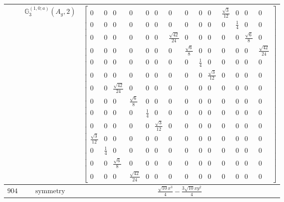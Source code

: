 \documentclass[fleqn,8pt,landscape]{jsarticle}
\begin{document}
\begin{longtable}{ccc}
$  $ & $ \mathbb{G}_{3}^{(1,0;a)}(A_{g},2) $ & $ \begin{bmatrix} 0 & 0 & 0 & 0 & 0 & 0 & 0 & 0 & 0 & 0 & \frac{\sqrt{3}}{12} & 0 & 0 & 0 \\ 0 & 0 & 0 & 0 & 0 & 0 & 0 & 0 & 0 & 0 & 0 & \frac{1}{4} & 0 & 0 \\ 0 & 0 & 0 & 0 & 0 & 0 & \frac{\sqrt{42}}{24} & 0 & 0 & 0 & 0 & 0 & \frac{\sqrt{6}}{8} & 0 \\ 0 & 0 & 0 & 0 & 0 & 0 & 0 & \frac{\sqrt{6}}{8} & 0 & 0 & 0 & 0 & 0 & \frac{\sqrt{42}}{24} \\ 0 & 0 & 0 & 0 & 0 & 0 & 0 & 0 & \frac{1}{4} & 0 & 0 & 0 & 0 & 0 \\ 0 & 0 & 0 & 0 & 0 & 0 & 0 & 0 & 0 & \frac{\sqrt{3}}{12} & 0 & 0 & 0 & 0 \\ 0 & 0 & \frac{\sqrt{42}}{24} & 0 & 0 & 0 & 0 & 0 & 0 & 0 & 0 & 0 & 0 & 0 \\ 0 & 0 & 0 & \frac{\sqrt{6}}{8} & 0 & 0 & 0 & 0 & 0 & 0 & 0 & 0 & 0 & 0 \\ 0 & 0 & 0 & 0 & \frac{1}{4} & 0 & 0 & 0 & 0 & 0 & 0 & 0 & 0 & 0 \\ 0 & 0 & 0 & 0 & 0 & \frac{\sqrt{3}}{12} & 0 & 0 & 0 & 0 & 0 & 0 & 0 & 0 \\ \frac{\sqrt{3}}{12} & 0 & 0 & 0 & 0 & 0 & 0 & 0 & 0 & 0 & 0 & 0 & 0 & 0 \\ 0 & \frac{1}{4} & 0 & 0 & 0 & 0 & 0 & 0 & 0 & 0 & 0 & 0 & 0 & 0 \\ 0 & 0 & \frac{\sqrt{6}}{8} & 0 & 0 & 0 & 0 & 0 & 0 & 0 & 0 & 0 & 0 & 0 \\ 0 & 0 & 0 & \frac{\sqrt{42}}{24} & 0 & 0 & 0 & 0 & 0 & 0 & 0 & 0 & 0 & 0 \end{bmatrix} $ \\ \hline
$ 904 $ & $ \text{symmetry} $ & $ \frac{\sqrt{10} x^{3}}{4} - \frac{3 \sqrt{10} x y^{2}}{4} $ \\

\end{longtable}
\end{document}
